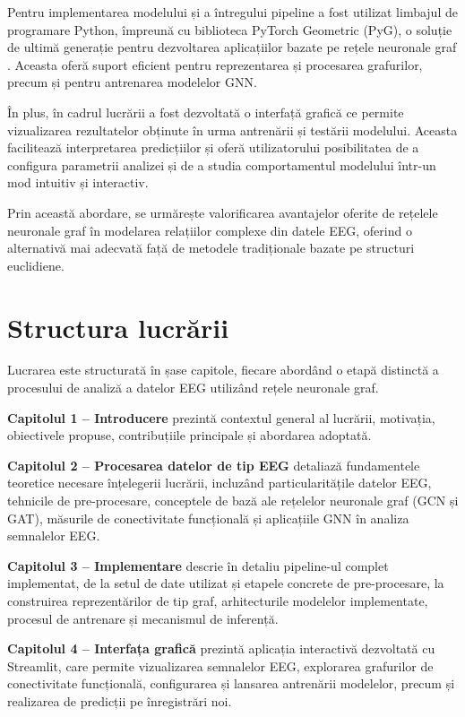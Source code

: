 \documentclass[12pt,a4paper]{report}
\theoremstyle{definition}
\theoremstyle{remark}
\begin{document}
 Pentru implementarea modelului și a întregului pipeline a fost utilizat limbajul de programare Python, împreună cu biblioteca PyTorch Geometric (PyG), o soluție de ultimă generație pentru dezvoltarea aplicațiilor bazate pe rețele neuronale graf \cite{fey2019fast}. Aceasta oferă suport eficient pentru reprezentarea și procesarea grafurilor, precum și pentru antrenarea modelelor GNN.

 În plus, în cadrul lucrării a fost dezvoltată o interfață grafică ce permite vizualizarea rezultatelor obținute în urma antrenării și testării modelului. Aceasta facilitează interpretarea predicțiilor și oferă utilizatorului posibilitatea de a configura parametrii analizei și de a studia comportamentul modelului într-un mod intuitiv și interactiv.

 Prin această abordare, se urmărește valorificarea avantajelor oferite de rețelele neuronale graf în modelarea relațiilor complexe din datele EEG, oferind o alternativă mai adecvată față de metodele tradiționale bazate pe structuri euclidiene.

 \section{Structura lucrării}

Lucrarea este structurată în șase capitole, fiecare abordând o etapă distinctă a procesului de analiză a datelor EEG utilizând rețele neuronale graf.

\textbf{Capitolul 1 -- Introducere} prezintă contextul general al lucrării, motivația, obiectivele propuse, contribuțiile principale și abordarea adoptată.

\textbf{Capitolul 2 -- Procesarea datelor de tip EEG} detaliază fundamentele teoretice necesare înțelegerii lucrării, incluzând particularitățile datelor EEG, tehnicile de pre-procesare, conceptele de bază ale rețelelor neuronale graf (GCN și GAT), măsurile de conectivitate funcțională și aplicațiile GNN în analiza semnalelor EEG.

\textbf{Capitolul 3 -- Implementare} descrie în detaliu pipeline-ul complet implementat, de la setul de date utilizat și etapele concrete de pre-procesare, la construirea reprezentărilor de tip graf, arhitecturile modelelor implementate, procesul de antrenare și mecanismul de inferență.

\textbf{Capitolul 4 -- Interfața grafică} prezintă aplicația interactivă dezvoltată cu Streamlit, care permite vizualizarea semnalelor EEG, explorarea grafurilor de conectivitate funcțională, configurarea și lansarea antrenării modelelor, precum și realizarea de predicții pe înregistrări noi.
\end{document}
